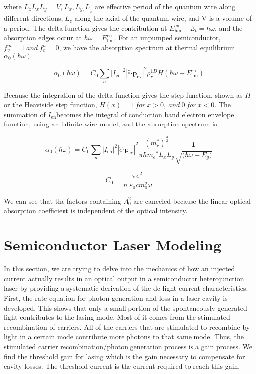 where \(L_{z}L_{x}L_{y} = V\), \({L_{x},L_{y,}L}_{z}\) are effective
period of the quantum wire along different directions, \(L_{z}\) along
the axial of the quantum wire, and V is a volume of a period. The delta
function gives the contribution at
\(E_{\text{hm}}^{\text{en}} + E_{t} = \hbar\omega\), and the
absorption edges occur at \(\hbar\omega = E_{\text{hm}}^{\text{en}}\).
For an unpumped semiconductor, \(f_{v}^{m} = 1\ and\ f_{c}^{n} = 0\), we
have the absorption spectrum at thermal equilibrium
\(\alpha_{0}\left( \hbar\omega \right)\)

\begin{equation}
\alpha_{0}\left( \hbar\omega \right) = C_{0}\sum_{n}^{}\left| I_{\text{en}} \right|^{2}\left| \hat{e}\bm{\cdot}\bm{p}_{\text{cv}} \right|^{2}\rho_{r}^{1D}H(\hbar\omega - E_{\text{hm}}^{\text{en}})
\end{equation}

Because the integration of the delta function gives the step function,
shown as $H$ or the Heaviside step function,
\(H\left( x \right) = 1\ for\ x > 0,\ and\ 0\ for\ x < 0\). The
summation of \(I_{\text{en}}\)becomes the integral of conduction band
electron envelope function, using an infinite wire model, and the
absorption spectrum is

\begin{equation}
  \alpha_{0}\left( \hbar\omega \right) = C_{0}{\sum_{n}^{}\left| I_{\text{en}} \right|^{2}\left| \hat{e}\bm{\cdot}\bm{p}_{\text{cv}} \right|}^{2}\frac{\left( m_{r}^{*} \right)^{\frac{3}{2}}}{\pi\hbar{m_{e}}^{*}L_{x}L_{y}}\frac{\bm{1}}{\sqrt{\bm{(}\hbar\omega - E_{g}\bm{)}}}
\end{equation}

\begin{equation}
C_{0} = \frac{\pi e^{2}}{n_{r}\varepsilon_{0}cm_{0}^{2}\omega}
\end{equation}

We can see that the factors containing \(A_{0}^{2}\) are canceled
because the linear optical absorption coefficient is independent of the
optical intensity.

\chapter[Lasing Modeling]{Semiconductor Laser Modeling}
\label{sec:model}

In this section, we are trying to delve into the mechanics of how an injected
current actually results in an optical output in a semiconductor heterojunction
laser by providing a systematic derivation of the dc light-current
characteristics. First, the rate equation for photon generation and loss in a
laser cavity is developed. This shows that only a small portion of the
spontaneously generated light contributes to the lasing mode. Most of it comes
from the stimulated recombination of carriers. All of the carriers that are
stimulated to recombine by light in a certain mode contribute more photons to
that same mode. Thus, the stimulated carrier recombination/photon generation
process is a gain process. We find the threshold gain for lasing which is the
gain necessary to compensate for cavity losses. The threshold current is the
current required to reach this gain.

